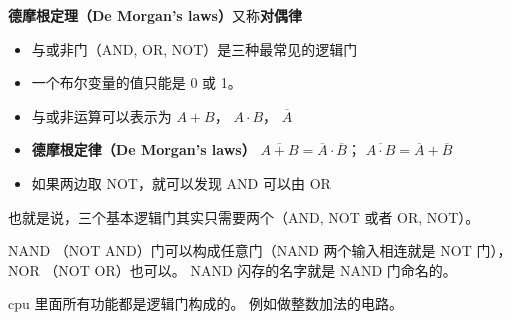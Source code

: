 
\begin{issues}
\issueDraft
\end{issues}

\textbf{德摩根定理（De Morgan's laws）}又称\textbf{对偶律}

\begin{itemize}
\item 与或非门（AND, OR, NOT）是三种最常见的逻辑门
\item 一个布尔变量的值只能是 0 或 1。
\item 与或非运算可以表示为 $A + B$， $A\cdot B$， $\overline A$
\item \textbf{德摩根定律（De Morgan's laws）} $\overline{A+B} = \overline A \cdot \overline B$； $\overline{A \cdot B} = \overline A + \overline B$
\item 如果两边取 NOT，就可以发现 AND 可以由 OR 
\end{itemize}

也就是说，三个基本逻辑门其实只需要两个（AND, NOT 或者 OR, NOT）。

NAND （NOT AND）门可以构成任意门（NAND 两个输入相连就是 NOT 门）， NOR （NOT OR）也可以。 NAND 闪存的名字就是 NAND 门命名的。

cpu 里面所有功能都是逻辑门构成的。 例如做整数加法的电路。
